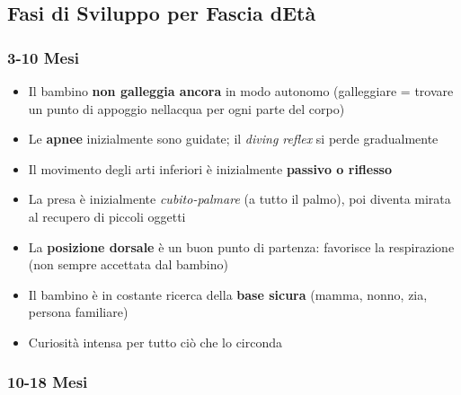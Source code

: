\documentclass[a4paper,11pt]{article}
\providecommand{\tightlist}{%
  \setlength{\itemsep}{0pt}\setlength{\parskip}{0pt}}
\begin{document}
\subsection{Fasi di Sviluppo per Fascia
      d\textquotesingle Età}\label{fasi-di-sviluppo-per-fascia-detuxe0}

\subsubsection{3-10 Mesi}\label{mesi}

\begin{itemize}
      \tightlist
      \item
            Il bambino \textbf{non galleggia ancora} in modo autonomo (galleggiare
            = trovare un punto di appoggio nell\textquotesingle acqua per ogni
            parte del corpo)
      \item
            Le \textbf{apnee} inizialmente sono guidate; il \emph{diving reflex}
            si perde gradualmente
      \item
            Il movimento degli arti inferiori è inizialmente \textbf{passivo o
                  riflesso}
      \item
            La presa è inizialmente \emph{cubito-palmare} (a tutto il palmo), poi
            diventa mirata al recupero di piccoli oggetti
      \item
            La \textbf{posizione dorsale} è un buon punto di partenza: favorisce
            la respirazione (non sempre accettata dal bambino)
      \item
            Il bambino è in costante ricerca della \textbf{base sicura} (mamma,
            nonno, zia, persona familiare)
      \item
            Curiosità intensa per tutto ciò che lo circonda
\end{itemize}

\subsubsection{10-18 Mesi}\label{mesi-1}
\end{document}
